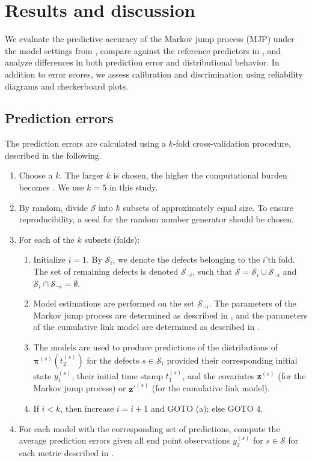 

\section{Results and discussion} \label{sec:results}
We evaluate the predictive accuracy of the Markov jump process (MJP) under the model settings from , compare against the reference predictors in , and analyze differences in both prediction error and distributional behavior. In addition to error scores, we assess calibration and discrimination using reliability diagrams and checkerboard plots.

\subsection{Prediction errors} \label{sec:prediction_error}
The prediction errors are calculated using a $k$-fold cross-validation procedure, described in the following. 

\begin{enumerate}
    \item Choose a $k$. The larger $k$ is chosen, the higher the computational burden becomes \citep{fushiki2011a}. We use $k = 5$ in this study.
    \item By random, divide $\mathcal{S}$ into $k$ subsets of approximately equal size. To ensure reproducibility, a seed for the random number generator should be chosen.
    \item For each of the $k$ subsets (folds):
    \begin{enumerate}
        \item Initialize $i = 1$. By $\mathcal{S}_i$, we denote the defects belonging to the $i$'th fold. The set of remaining defects is denoted $\mathcal{S}_{\neg i}$, such that $\mathcal{S} = \mathcal{S}_i \cup \mathcal{S}_{\neg i}$ and $\mathcal{S}_i \cap \mathcal{S}_{\neg i} = \emptyset$.
        \item Model estimations are performed on the set $\mathcal{S}_{\neg i}$. The parameters of the Markov jump process are determined as described in , and the parameters of the cumulative link model are determined as described in .
        \item The models are used to produce predictions of the distributions of $\bm{\pi}^{(s)}\left( t_2^{(s)}\right)$ for the defects $s \in \mathcal{S}_i$ provided their corresponding initial state $y_1^{(s)}$, their initial time stamp $t_1^{(s)}$, and the covariates $\bm{z}^{(s)}$ (for the Markov jump process) or $\bm{z}'^{(s)}$ (for the cumulative link model).
        \item If $i < k$, then increase $i = i + 1$ and GOTO (a); else GOTO 4.
    \end{enumerate}
    \item For each model with the corresponding set of predictions, compute the average prediction errors given all end point observations $y_2^{(s)}$ for $s \in \mathcal{S}$ for each metric described in .
\end{enumerate}

